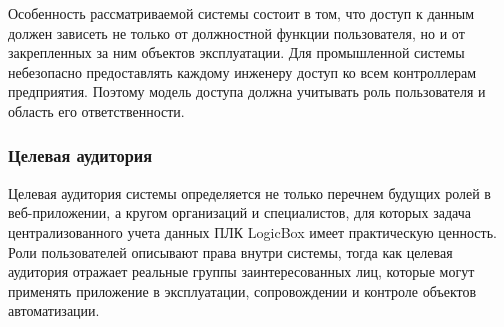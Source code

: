 Особенность рассматриваемой системы состоит в том, что доступ к данным должен зависеть не только от должностной функции пользователя, но и от закрепленных за ним объектов эксплуатации. Для промышленной системы небезопасно предоставлять каждому инженеру доступ ко всем контроллерам предприятия. Поэтому модель доступа должна учитывать роль пользователя и область его ответственности.
\subsubsection{Целевая аудитория}

Целевая аудитория системы определяется не только перечнем будущих ролей в веб-приложении, а кругом организаций и специалистов, для которых задача централизованного учета данных ПЛК LogicBox имеет практическую ценность. Роли пользователей описывают права внутри системы, тогда как целевая аудитория отражает реальные группы заинтересованных лиц, которые могут применять приложение в эксплуатации, сопровождении и контроле объектов автоматизации.

